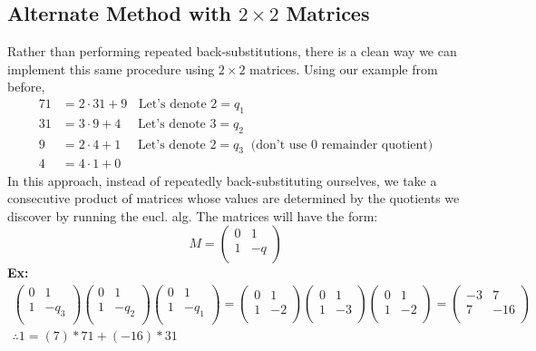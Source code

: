 \subsection{Alternate Method with $2\times 2$ Matrices}
Rather than performing repeated back-substitutions, there is a clean way we can implement this same procedure using $2\times 2$ matrices. Using our example from before,\\
\begin{align}
    71&= 2\cdot 31+9 \ \ \ \ \text{Let's denote }2=q_1\nonumber\\
    31&= 3\cdot 9+4 \ \ \ \ \ \ \text{Let's denote }3=q_2\nonumber\\
    9&= 2\cdot 4+1 \ \ \ \ \ \ \text{Let's denote }2=q_3 \ \text{ (don't use 0 remainder quotient)}\nonumber\\ \hline
    4&= 4\cdot 1+0 \nonumber
\end{align}
In this approach, instead of repeatedly back-substituting ourselves, we take a consecutive product of matrices whose values are determined by the quotients we discover by running the eucl. alg. The matrices will have the form:
\begin{equation}
   M=
  \left( {\begin{array}{cc}
   0 & 1 \\
   1 & -q \\
  \end{array} } \right)
\nonumber
\end{equation}
\textbf{Ex:}
\begin{align}
  \left( {\begin{array}{cc}
   0 & 1 \\
   1 & -q_3 \\
  \end{array} } \right)\left( {\begin{array}{cc}
   0 & 1 \\
   1 & -q_2 \\
  \end{array} } \right)\left( {\begin{array}{cc}
   0 & 1 \\
   1 & -q_1 \\
  \end{array} } \right) 
  =\left( {\begin{array}{cc}
   0 & 1 \\
   1 & -2 \\
  \end{array} } \right)\left( {\begin{array}{cc}
   0 & 1 \\
   1 & -3 \\
  \end{array} } \right)\left( {\begin{array}{cc}
   0 & 1 \\
   1 & -2 \\
  \end{array} } \right)=\left( {\begin{array}{cc}
   -3 & 7 \\
   7 & -16 \\
  \end{array} } \right) \nonumber\\
  \therefore 1= (7)*71+(-16)*31
\nonumber
\end{align}

